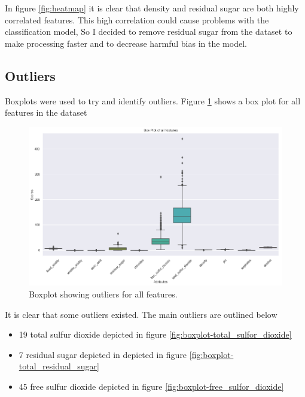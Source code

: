 In figure \ref{fig:heatmap} it is clear that density and residual sugar are both highly correlated features. This high correlation could cause problems with the classification model, So I decided to remove residual sugar from the dataset to make processing faster and to decrease harmful bias in the model.

\subsection{Outliers}

Boxplots were used to try and identify outliers. Figure \ref{fig:boxplot-all} shows a box plot for all features in the dataset

\begin{figure}[H]
\centering
        \includegraphics[totalheight=8cm]{images/boxplot-all.png}
    \caption{Boxplot showing outliers for all features.}
    \label{fig:boxplot-all}
\end{figure}

It is clear that some outliers existed. The main outliers are outlined below 

\begin{itemize}
  \item 19 total sulfur dioxide depicted in figure \ref{fig:boxplot-total_sulfor_dioxide}
  \item 7 residual sugar depicted in depicted in figure \ref{fig:boxplot-total_residual_sugar}
  \item 45 free sulfur dioxide depicted in figure \ref{fig:boxplot-free_sulfor_dioxide}
\end{itemize}

